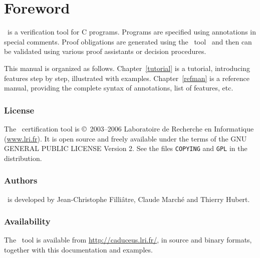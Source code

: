 \documentclass[12pt,a4paper,twoside,openright]{report}
\begin{document}
\sloppy



\chapter*{Foreword}

\caduceus\ is a verification tool for C programs. Programs are
specified using annotations in special comments. Proof obligations are
generated using the \why\ tool~\cite{Why} and then can be validated using
various proof assistants or decision procedures.

\medskip

This manual is organized as follows. Chapter~\ref{tutorial} is a
tutorial, introducing \caduceus{} features step by step, illustrated
with examples. Chapter~\ref{refman} is a reference manual, providing
the complete syntax of annotations, list of features, etc.

\subsection*{License}

The \caduceus\ certification tool is \copyright\ 2003--2006 Laboratoire de
Recherche en Informatique (\url{www.lri.fr}).
It is open source and freely available under the terms of the GNU
GENERAL PUBLIC LICENSE Version 2. See the files \texttt{COPYING} and
\texttt{GPL} in the distribution.

\subsection*{Authors}

\caduceus\ is developed by Jean-Christophe Filli\^atre, Claude
March\'e and Thierry Hubert.

\subsection*{Availability}

The \caduceus\ tool is available from
\url{http://caduceus.lri.fr/}, 
in source and binary formats, together with this documentation and
examples.
\end{document}
